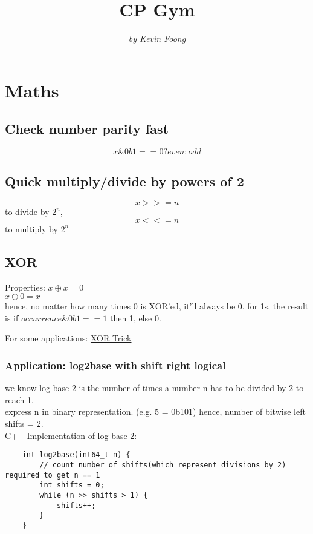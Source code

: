 \documentclass[12pt]{article}
\begin{document}
\title{\textbf{CP Gym}} 
\author{\textit{by Kevin Foong}} 
\date{}
\maketitle

\section{Maths} 

\subsection{Check number parity fast}
\[ x \& 0b1 == 0 ? even : odd\]

\subsection{Quick multiply/divide by powers of 2} 
\[ x >>= n\] to divide by \(2^n\), \[ x <<= n \] to multiply by \(2^n\)

\subsection{XOR}
Properties: 
\( x \oplus x = 0 \) \\
\( x \oplus 0 = x \)\\
hence, no matter how many times 0 is XOR'ed, it'll always be 0. 
for 1s, the result is if \( occurrence \& 0b1 == 1 \) then 1, else 0.

For some applications: \href{https://florian.github.io/xor-trick/}{XOR Trick} 


\subsubsection{Application: log2base with shift right logical}
we know log base 2 is the number of times a number n has to be divided by 2 to reach 1. \\ 
express n in binary representation. (e.g. 5 = 0b101)
hence, number of bitwise left shifts = 2. \\ [\baselineskip] 

\noindent C++ Implementation of log base 2: 
\begin{verbatim}
	int log2base(int64_t n) {
		// count number of shifts(which represent divisions by 2) required to get n == 1
		int shifts = 0; 
		while (n >> shifts > 1) {
			shifts++; 
		}
	}  
\end{verbatim} 
\end{document}

